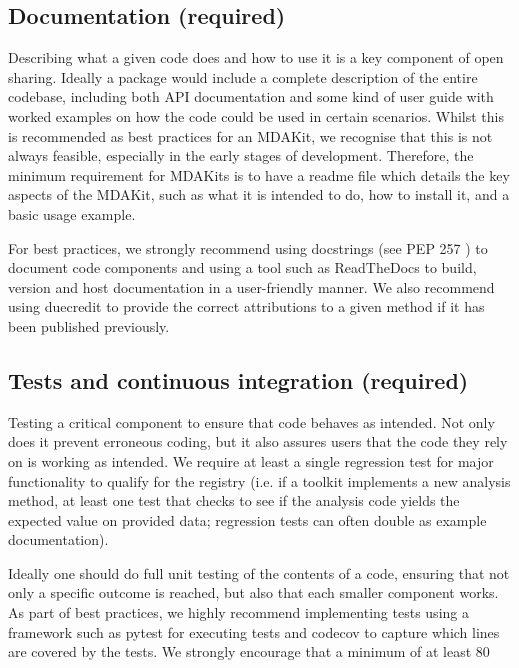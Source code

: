 \documentclass[9pt,whitepaper]{livecoms}
\begin{document}
\subsection{Documentation (required)}
\label{sec:documentation}

Describing what a given code does and how to use it is a key component of open sharing. Ideally a package would include a complete description of the entire codebase, including both API documentation and some kind of user guide with worked examples on how the code could be used in certain scenarios. Whilst this is recommended as best practices for an MDAKit, we recognise that this is not  always feasible, especially in the early stages of development. Therefore, the minimum requirement for MDAKits is to have a readme file which details the key aspects of the MDAKit, such as what it is intended to do, how to install it, and a basic usage example.

For best practices, we strongly recommend using docstrings (see PEP 257 \cite{noauthor_pep_nodate}) to document code components and using a tool such as ReadTheDocs \cite{read_the_docs_inc_read_2022} to build, version and host documentation in a user-friendly manner. We also recommend using duecredit \cite{halchenko_duecreditduecredit_2021} to provide the correct attributions to a given method if it has been published previously.

\subsection{Tests and continuous integration (required)}
\label{sec:tests}

Testing a critical component to ensure that code behaves as intended. Not only does it prevent erroneous coding, but it also assures users that the code they rely on is working as intended. We require at least a single regression test for major functionality to qualify for the registry (i.e. if a toolkit implements a new analysis method, at least one test that checks to see if the analysis code yields the expected value on provided data;  regression tests can often double as example documentation).

Ideally one should do full unit testing of the contents of a code, ensuring that not only a specific outcome is reached, but also that each smaller component works. As part of best practices, we highly recommend implementing tests using a framework such as pytest \cite{krekel_pytest-devpytest_2004} for executing tests and codecov \cite{codecov_llc_codecov_2022} to capture which lines are covered by the tests. We strongly encourage that a minimum of at least 80%
\end{document}
